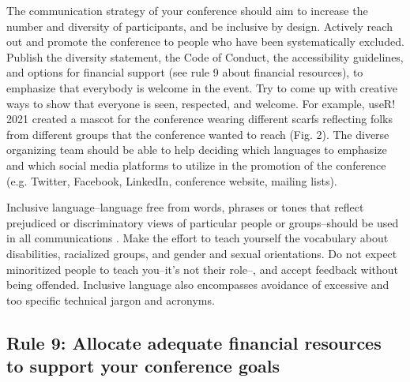 \documentclass[10pt,letterpaper]{article}
\begin{document}
The communication strategy of your conference should aim to increase the number and diversity of participants, and be inclusive by design.
Actively reach out and promote the conference to people who have been systematically excluded. 
Publish the diversity statement, the Code of Conduct, the accessibility guidelines, and  options for financial support (see rule 9 about financial resources), to emphasize that everybody is welcome in the event.
Try to come up with creative ways to show that everyone is seen, respected, and welcome. For example, useR! 2021 created a mascot for the conference wearing different scarfs reflecting folks from different groups that the conference wanted to reach (Fig. 2). 
The diverse organizing team should be able to help deciding which languages to emphasize and which social media platforms to utilize in the promotion of the conference (e.g. Twitter, Facebook, LinkedIn, conference website, mailing lists).

Inclusive language--language free from words, phrases or tones that reflect prejudiced or discriminatory views of particular people or groups--should be used in all communications \cite{hallDesigningDiversityInclusion2019}. 
Make the effort to teach yourself the vocabulary about disabilities, racialized groups, and gender and sexual orientations. %
Do not expect minoritized people to teach you--it's not their role--, and accept feedback without being offended.
Inclusive language also encompasses avoidance of excessive and too specific technical jargon and acronyms. 
%


\subsection*{Rule 9: Allocate adequate financial resources to support your conference goals}
\label{rule_financial}
\end{document}
